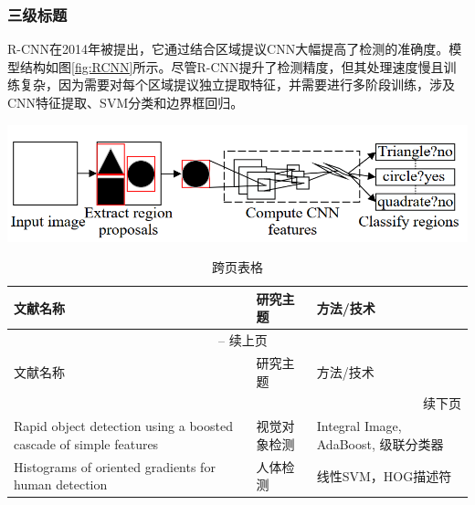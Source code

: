 \documentclass{article}
\begin{document}
\begin{multicols}{2}
\subsubsection{三级标题}
R-CNN在2014年被提出，它通过结合区域提议CNN大幅提高了检测的准确度。模型结构如图\ref{fig:RCNN}所示。尽管R-CNN提升了检测精度，但其处理速度慢且训练复杂，因为需要对每个区域提议独立提取特征，并需要进行多阶段训练，涉及CNN特征提取、SVM分类和边界框回归。

\begin{center}
    \begin{minipage}{\columnwidth}
        \centering
        \includegraphics[width=\columnwidth]{fig/RCNN.png}
        \label{fig:RCNN}
    \end{minipage}
\end{center}


\end{multicols}

\begin{longtable}{@{}p{}p{}p{}@{}}
    \caption{跨页表格} \label{tab:literature_review} \\
    \toprule
    文献名称 & 研究主题 & 方法/技术 \\
    \midrule
    \endfirsthead
    \multicolumn{3}{c}{\tablename\ \thetable{} -- 续上页} \\
    \hline
    文献名称 & 研究主题 & 方法/技术 \\
    \hline
    \endhead

    \hline
    \multicolumn{3}{r}{{续下页}} \\
    \hline
    \endfoot

    \hline
    \endlastfoot

    Rapid object detection using a boosted cascade of simple features & 视觉对象检测 & Integral Image, AdaBoost, 级联分类器 \\ \hline
    Histograms of oriented gradients for human detection & 人体检测 & 线性SVM，HOG描述符 \\ \hline
\end{longtable}

\begin{multicols}{2}


\end{multicols}
\end{document}
